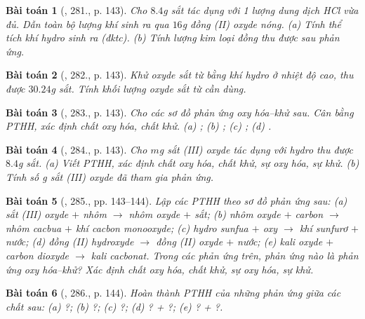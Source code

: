 \documentclass{article}
\newtheorem{baitoan}{Bài toán}
\begin{document}
\begin{baitoan}[\cite{An_400_BT_Hoa_Hoc_8_2020}, 281., p. 143]
	Cho $8.4$\emph{g} sắt tác dụng với 1 lượng dung dịch \emph{HCl} vừa đủ. Dẫn toàn bộ lượng khí sinh ra qua $16$\emph{g} đồng (II) oxyde nóng. (a) Tính thể tích khí hydro sinh ra (đktc). (b) Tính lượng kim loại đồng thu được sau phản ứng.
\end{baitoan}

\begin{baitoan}[\cite{An_400_BT_Hoa_Hoc_8_2020}, 282., p. 143]
	Khử oxyde sắt từ bằng khí hydro ở nhiệt độ cao, thu được $30.24$\emph{g} sắt. Tính khối lượng oxyde sắt từ cần dùng.
\end{baitoan}

\begin{baitoan}[\cite{An_400_BT_Hoa_Hoc_8_2020}, 283., p. 143]
	Cho các sơ đồ phản ứng oxy hóa--khử sau. Cân bằng PTHH, xác định chất oxy hóa, chất khử. (a) \emph{}; (b) \emph{}; (c) \emph{}; (d) \emph{}.
\end{baitoan}

\begin{baitoan}[\cite{An_400_BT_Hoa_Hoc_8_2020}, 284., p. 143]
	Cho $m$\emph{g} sắt (III) oxyde tác dụng với hydro thu được $8.4$\emph{g} sắt. (a) Viết PTHH, xác định chất oxy hóa, chất khử, sự oxy hóa, sự khử. (b) Tính số \emph{g} sắt (III) oxyde đã tham gia phản ứng.
\end{baitoan}

\begin{baitoan}[\cite{An_400_BT_Hoa_Hoc_8_2020}, 285., pp. 143--144]
	Lập các PTHH theo sơ đồ phản ứng sau: (a) sắt (III) oxyde $+$ nhôm $\to$ nhôm oxyde $+$ sắt; (b) nhôm oxyde $+$ carbon $\to$ nhôm cacbua $+$ khí cacbon monooxyde; (c) hydro sunfua $+$ oxy $\to$ khí sunfurơ $+$ nước; (d) đồng (II) hydroxyde $\to$ đồng (II) oxyde $+$ nước; (e) kali oxyde $+$ carbon dioxyde $\to$ kali cacbonat. Trong các phản ứng trên, phản ứng nào là phản ứng oxy hóa--khử? Xác định chất oxy hóa, chất khử, sự oxy hóa, sự khử.
\end{baitoan}

\begin{baitoan}[\cite{An_400_BT_Hoa_Hoc_8_2020}, 286., p. 144]
	Hoàn thành PTHH của những phản ứng giữa các chất sau: (a) \emph{} ?; (b) \emph{} ?; (c) \emph{} ?; (d) \emph{} ? + ?; (e) \emph{} ? + ?.
\end{baitoan}
\end{document}
